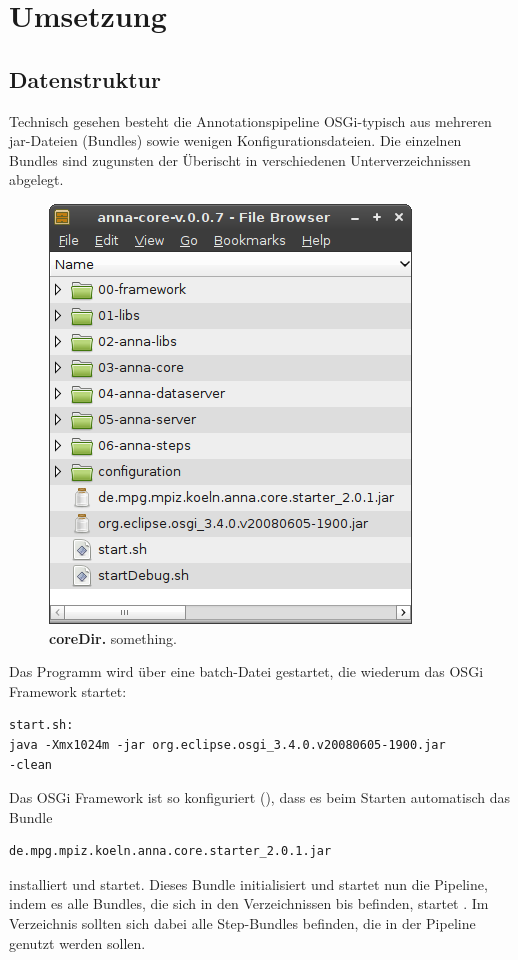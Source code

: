 \chapter{Umsetzung}
\todo{\dots}





\section{Datenstruktur }
Technisch gesehen besteht die Annotationspipeline OSGi-typisch aus mehreren
jar-Dateien (Bundles) sowie wenigen Konfigurationsdateien.
Die einzelnen Bundles sind zugunsten der Überischt in verschiedenen
Unterverzeichnissen abgelegt.

\begin{figure}[htbp]
	\begin{center}
		\includegraphics[scale=0.7]{pics/coreDir.png}
	\caption[coreDir]{
	\textbf{coreDir.}
	something.}
	\end{center}
	\label{fig:coreDir}
\end{figure}

Das Programm wird über eine batch-Datei gestartet,
die wiederum das OSGi Framework startet:
\begin{verbatim}
start.sh:
java -Xmx1024m -jar org.eclipse.osgi_3.4.0.v20080605-1900.jar
-clean\end{verbatim}
Das OSGi Framework ist so konfiguriert (), dass
es beim Starten automatisch das Bundle
\begin{verbatim}
de.mpg.mpiz.koeln.anna.core.starter_2.0.1.jar
\end{verbatim}
installiert und startet.
Dieses Bundle initialisiert und startet nun die Pipeline, indem es alle Bundles,
die sich in den Verzeichnissen  bis  befinden, startet
. Im Verzeichnis  sollten sich dabei
alle Step-Bundles befinden, die in der Pipeline genutzt werden sollen.

